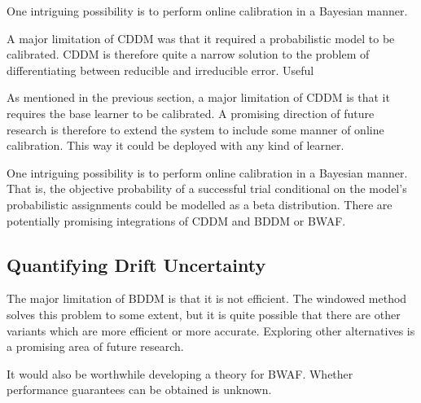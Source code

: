 One intriguing possibility is to perform online calibration in a Bayesian manner. 

A major limitation of CDDM was that it required a probabilistic model to be calibrated. CDDM is therefore quite a narrow solution to the problem of differentiating between reducible and irreducible error. Useful

As mentioned in the previous section, a major limitation of CDDM is that it requires the base learner to be calibrated. A promising direction of future research is therefore to extend the system to include some manner of online calibration. This way it could be deployed with any kind of learner. 

One intriguing possibility is to perform online calibration in a Bayesian manner. That is, the objective probability of a successful trial conditional on the model's probabilistic assignments could be modelled as a beta distribution. There are potentially promising integrations of CDDM and BDDM or BWAF.

\subsection{Quantifying Drift Uncertainty}

The major limitation of BDDM is that it is not efficient. The windowed method solves this problem to some extent, but it is quite possible that there are other variants which are more efficient or more accurate. Exploring other alternatives is a promising area of future research. 

It would also be worthwhile developing a theory for BWAF. Whether performance guarantees can be obtained is unknown. 